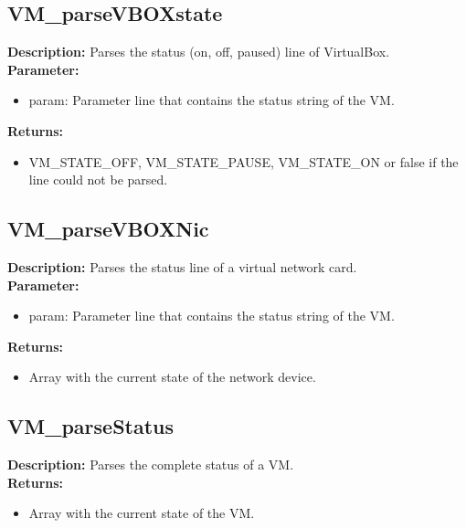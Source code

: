 \subsection{VM\_parseVBOXstate}
\textbf{Description:} Parses the status (on, off, paused) line of VirtualBox.\\
\textbf{Parameter:}
\begin{itemize}
\item param: Parameter line that contains the status string of the VM.
\end{itemize}
\textbf{Returns:}
\begin{itemize}
\item VM\_STATE\_OFF, VM\_STATE\_PAUSE, VM\_STATE\_ON or false if the line could not be parsed.
\end{itemize}

\subsection{VM\_parseVBOXNic}
\textbf{Description:} Parses the status line of a virtual network card.\\
\textbf{Parameter:}
\begin{itemize}
\item param: Parameter line that contains the status string of the VM.
\end{itemize}
\textbf{Returns:}
\begin{itemize}
\item Array with the current state of the network device.
\end{itemize}

\subsection{VM\_parseStatus}
\textbf{Description:} Parses the complete status of a VM.\\
\textbf{Returns:}
\begin{itemize}
\item Array with the current state of the VM.
\end{itemize}

